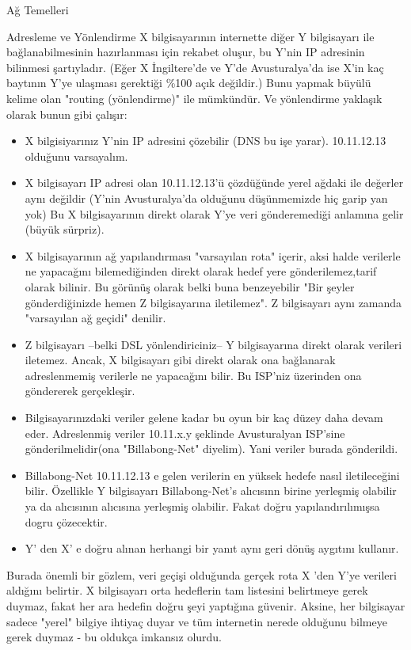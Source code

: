 \begin{section}{Ağ Temelleri}
\begin{subsection}{Adresleme ve Yönlendirme}
X bilgisayarının internette diğer Y bilgisayarı ile bağlanabilmesinin hazırlanması için rekabet oluşur, bu Y'nin IP adresinin bilinmesi şartıyladır. (Eğer X İngiltere'de ve Y'de Avusturalya'da ise X'in kaç baytının Y'ye ulaşması gerektiği \%100 açık değildir.) Bunu yapmak büyülü kelime olan "routing (yönlendirme)" ile mümkündür. Ve yönlendirme yaklaşık olarak bunun gibi çalışır:
\begin{itemize}
\item X bilgisiyarınız Y'nin IP adresini çözebilir (DNS bu işe yarar). 10.11.12.13 olduğunu varsayalım.
\item X bilgisayarı IP adresi olan 10.11.12.13'ü çözdüğünde yerel ağdaki ile değerler aynı değildir (Y'nin Avusturalya'da olduğunu düşünmemizde hiç garip yan yok)
 Bu X bilgisayarının direkt olarak Y'ye veri gönderemediği anlamına gelir (büyük sürpriz).
\item X bilgisayarının ağ yapılandırması "varsayılan rota" içerir, aksi halde verilerle ne yapacağını bilemediğinden direkt olarak hedef yere gönderilemez,tarif olarak bilinir. Bu görünüş olarak belki buna benzeyebilir "Bir şeyler gönderdiğinizde hemen Z bilgisayarına iletilemez". Z bilgisayarı aynı zamanda "varsayılan ağ geçidi" denilir.
\item Z bilgisayarı --belki DSL yönlendiriciniz-- Y bilgisayarına direkt olarak verileri iletemez. Ancak, X bilgisayarı gibi direkt olarak ona bağlanarak adreslenmemiş verilerle ne yapacağını bilir. Bu ISP'niz üzerinden ona göndererek gerçekleşir.
\item Bilgisayarınızdaki veriler gelene kadar bu oyun bir kaç düzey daha devam eder. Adreslenmiş veriler 10.11.x.y şeklinde  Avusturalyan ISP'sine gönderilmelidir(ona "Billabong-Net" diyelim). Yani veriler burada gönderildi.
\item Billabong-Net 10.11.12.13 e gelen verilerin en yüksek hedefe nasıl iletileceğini bilir. Özellikle Y bilgisayarı Billabong-Net's alıcısınn birine yerleşmiş olabilir ya da alıcısının alıcısına yerleşmiş olabilir. Fakat doğru yapılandırılımışsa dogru çözecektir.
\item Y' den X' e doğru alınan herhangi bir yanıt aynı geri dönüş aygıtını kullanır.
\end{itemize}

Burada önemli bir gözlem, veri geçişi olduğunda gerçek rota X 'den Y'ye verileri aldığını belirtir. X bilgisayarı orta hedeflerin tam listesini belirtmeye gerek duymaz, fakat her ara hedefin doğru şeyi yaptığına güvenir. Aksine, her bilgisayar sadece "yerel" bilgiye ihtiyaç duyar ve tüm internetin nerede olduğunu bilmeye gerek duymaz - bu oldukça imkansız olurdu.


\end{subsection}
\end{section}
